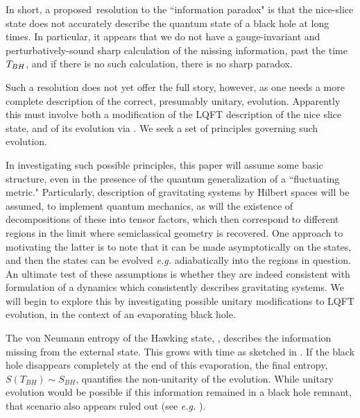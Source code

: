 In short, a proposed\QBHB\ resolution to the ``information paradox" is that the nice-slice state does not accurately describe the quantum state of a black hole at long times.  In particular, 
it appears that we do not have a gauge-invariant and perturbatively-sound sharp calculation of the missing information, past the time ${T_{BH}}$, and if there is no such calculation, there is no sharp paradox.

Such a resolution does not yet offer the full story, however, as one needs a more complete description of the correct, presumably unitary, evolution.  Apparently this must involve both a modification of the LQFT description of the nice slice state, and of its evolution via \unitop.  We seek a set of principles governing such evolution.

In investigating such possible principles, this paper will assume some basic structure, even in the presence of the quantum generalization of a ``fluctuating metric."  Particularly, description of gravitating systems by Hilbert spaces will be assumed, to implement quantum mechanics, as will the existence of decompositions of these into tensor factors, which then correspond to different regions in the limit where semiclassical geometry is recovered.  One approach to motivating the latter is to note that it can be made asymptotically on the states, and then the states can be evolved {\it e.g.} adiabatically into the regions in question.  An ultimate test of these assumptions is whether they are indeed consistent with formulation of a dynamics which consistently describes gravitating systems.  We will begin to explore this by investigating possible unitary modifications to LQFT evolution, in the context of an evaporating black hole.





The von Neumann entropy of the Hawking state, \vN, describes the information missing from the external state.  This grows with time as sketched in \entropfig. If the black hole disappears completely at the end of this evaporation, the final entropy, $S(T_{BH})\sim S_{BH}$, quantifies the non-unitarity of the evolution.  While unitary evolution would be possible if this information remained in a black hole remnant, that scenario also appears ruled out (see {\it e.g.}  ).  

